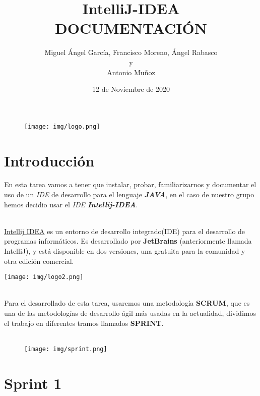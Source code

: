 \documentclass{article}
\title{IntelliJ-IDEA\\\textbf{DOCUMENTACIÓN}}
\author{Miguel Ángel García, Francisco Moreno, Ángel Rabasco\\ y \\Antonio Muñoz}
\date{12 de Noviembre de 2020}
\begin{document}
  \maketitle
      \pagestyle{fancy}

      \begin{figure}[b]
        \centering
        \texttt{[image: img/logo.png]}
      \end{figure}
  
  \newpage
    \tableofcontents

  \newpage
    \section{Introducción}
      En esta tarea vamos a tener que instalar, probar, familiarizarnos y documentar el uso de un \textit{IDE} de desarrollo para el lenguaje \textbf{\textit{JAVA}}, en el caso de nuestro grupo 
      hemos decidio usar el \textit{IDE \textbf{Intellij-IDEA}}. 
      \\\\
      \begin{minipage}{0.5\textwidth}
        \href{https://www.jetbrains.com/es-es/idea/}{Intellij IDEA} es un entorno de desarrollo integrado(IDE) para el desarrollo de programas informáticos. Es desarrollado por \textbf{JetBrains} 
        (anteriormente llamada IntelliJ), y está disponible en dos versiones, una gratuita para la comunidad y otra edición comercial.
      \end{minipage}
      \begin{minipage}{\textwidth}
        \texttt{[image: img/logo2.png]}
      \end{minipage}
      \\
      Para el desarrollado de esta tarea, usaremos una metodología \textbf{SCRUM}, que es una de las metodologías de desarrollo ágil más usadas en la actualidad, dividimos el trabajo en diferentes
      tramos llamados \textbf{SPRINT}.
      \\\\
      \begin{figure}[h]
        \centering
        \texttt{[image: img/sprint.png]}
      \end{figure}

  \newpage
    \section{Sprint 1}
\end{document}
